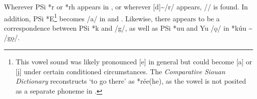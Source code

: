 \documentclass[output=paper]{LSP/langsci}
\begin{document}
\begin{table}[h]
\centering
\caption{Verbs of motion in , , and Yuchi} \label{motionverbs}
\end{table}

\largerpage
Wherever PSi *r or *rh appears in , or wherever  [d]{\textasciitilde}/r/ appears,  /\textbeltl/  is found. In addition, PSi *E\footnote{This  vowel sound was likely pronounced [e] in general but could become [a] or [\k{i}] under certain conditioned circumstances. The \emph{Comparative Siouan Dictionary} reconstructs `to go there' as *rée(he), as the  vowel is not posited as a separate phoneme in \citet{Rankinetal2015AccessSeptember}.} becomes /a/ in  and . Likewise, there appears to be a correspondence between PSi *k and  /g/, as well as PSi *uu and Yu /\k{o}/ in *k\'uu {\textasciitilde} /g\k{o}/.
\end{document}
